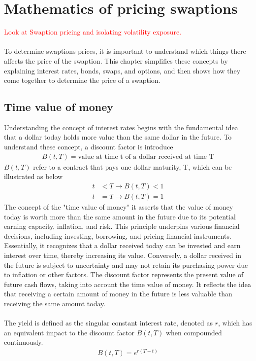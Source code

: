 \section{Mathematics of pricing swaptions}
\textcolor{red}{Look at Swaption pricing and isolating volatility exposure.}
\\\\
To determine swaptions prices, it is important to understand which things there affects the price of the swaption. 
This chapter simplifies these concepts by explaining interest rates, bonds, swaps, and options, 
and then shows how they come together to determine the price of a swaption.
\subsection{Time value of money}
Understanding the concept of interest rates begins with the fundamental idea that a dollar today holds 
more value than the same dollar in the future. To understand these concept, a discount factor is introduce 
\begin{align*}
    B(t,T) = \text{value at time t of a dollar received at time T}
\end{align*} 
$B(t,T)$ refer to a contract that pays one dollar maturity, T, which can be illustrated as below
\begin{align*}
    t & < T \rightarrow B(t,T) < 1 \\
    t & = T \rightarrow B(t,T) = 1
\end{align*}
The concept of the "time value of money" it asserts that the value of money today is worth more than
the same amount in the future due to its potential earning capacity, inflation, and risk.
This principle underpins various financial decisions, including investing, borrowing,
and pricing financial instruments. Essentially, it recognizes that a dollar received today can be invested 
and earn interest over time, thereby increasing its value. Conversely, a dollar received in the future
is subject to uncertainty and may not retain its purchasing power due to inflation or other factors.
The discount factor represents the present value of future cash flows, taking into account the time value of money.
It reflects the idea that receiving a certain amount of money in the future is less valuable than receiving 
the same amount today.
\\\\
The yield is defined as the singular constant interest rate, denoted as $r$,
which has an equivalent impact to the discount factor $B(t, T)$ when compounded continuously.
\begin{align*}
    B(t,T)= e^{r(T-t)}
\end{align*}


